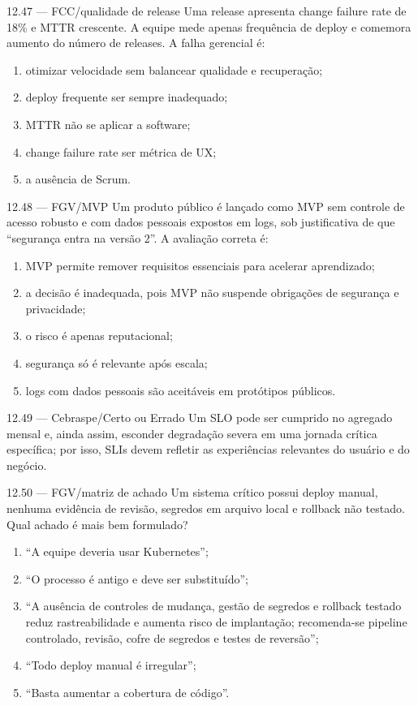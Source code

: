 \begin{questao}{ 12.47 — FCC/qualidade de release}
Uma release apresenta change failure rate de 18\% e MTTR crescente. A equipe mede apenas frequência de deploy e comemora aumento do número de releases. A falha gerencial é:
\begin{enumerate}[label=\Alph*)]
\item otimizar velocidade sem balancear qualidade e recuperação;
\item deploy frequente ser sempre inadequado;
\item MTTR não se aplicar a software;
\item change failure rate ser métrica de UX;
\item a ausência de Scrum.
\end{enumerate}
\end{questao}

\begin{questao}{ 12.48 — FGV/MVP}
Um produto público é lançado como MVP sem controle de acesso robusto e com dados pessoais expostos em logs, sob justificativa de que ``segurança entra na versão 2''. A avaliação correta é:
\begin{enumerate}[label=\Alph*)]
\item MVP permite remover requisitos essenciais para acelerar aprendizado;
\item a decisão é inadequada, pois MVP não suspende obrigações de segurança e privacidade;
\item o risco é apenas reputacional;
\item segurança só é relevante após escala;
\item logs com dados pessoais são aceitáveis em protótipos públicos.
\end{enumerate}
\end{questao}

\begin{questao}{ 12.49 — Cebraspe/Certo ou Errado}
Um SLO pode ser cumprido no agregado mensal e, ainda assim, esconder degradação severa em uma jornada crítica específica; por isso, SLIs devem refletir as experiências relevantes do usuário e do negócio.
\end{questao}

\begin{questao}{ 12.50 — FGV/matriz de achado}
Um sistema crítico possui deploy manual, nenhuma evidência de revisão, segredos em arquivo local e rollback não testado. Qual achado é mais bem formulado?
\begin{enumerate}[label=\Alph*)]
\item ``A equipe deveria usar Kubernetes'';
\item ``O processo é antigo e deve ser substituído'';
\item ``A ausência de controles de mudança, gestão de segredos e rollback testado reduz rastreabilidade e aumenta risco de implantação; recomenda-se pipeline controlado, revisão, cofre de segredos e testes de reversão'';
\item ``Todo deploy manual é irregular'';
\item ``Basta aumentar a cobertura de código''.
\end{enumerate}
\end{questao}
